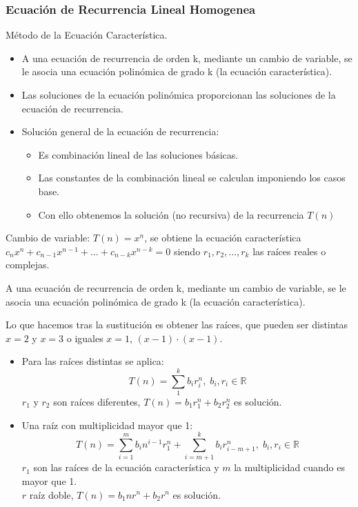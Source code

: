 \subsubsection{Ecuación de Recurrencia Lineal Homogenea}
Método de la Ecuación Característica.
\begin{itemize}
	\item A una ecuación de recurrencia de orden k, mediante un cambio de variable, se le asocia una ecuación polinómica de grado k (la ecuación característica).
	\item Las soluciones de la ecuación polinómica proporcionan las soluciones de la ecuación de recurrencia.
	\item Solución general de la ecuación de recurrencia:
	      \begin{itemize}
		      \item Es combinación lineal de las soluciones básicas.
		      \item Las constantes de la combinación lineal se calculan imponiendo los casos base.
		      \item Con ello obtenemos la solución (no recursiva) de la recurrencia $T(n)$
	      \end{itemize}

\end{itemize}

Cambio de variable: $T(n)= x^n$, se obtiene la ecuación característica $c_n x^n+ c_{n-1}x^{n-1}+ ... + c_{n-k}x^{n-k} = 0$ siendo $r_1, r_2, ..., r_k$ las raíces reales o complejas.

A una ecuación de recurrencia de orden k, mediante un cambio de variable, se le asocia una ecuación polinómica de grado k (la ecuación característica).

Lo que hacemos tras la sustitución es obtener las raíces, que pueden ser distintas $x=2$ y $x=3$ o iguales $x=1$, $(x-1) \cdot (x-1)$.
\begin{itemize}
	\item Para las raíces distintas se aplica:
	      $$T(n) = \sum _1 ^k b_i r_i^n, \; b_i, r_i \in \mathbb{R}$$
	      $r_1$ y $r_2$ son raíces diferentes, $T(n)=b_1r_1^n+b_2r_2^n$ es solución.
	\item Una raíz con multiplicidad mayor que 1:
	      $$T(n) = \sum _{i=1} ^m b_i n^{i-1}r_1^n+\sum _{i=m+1} ^k b_i r_{i-m+1}^n, \; b_i, r_i \in \mathbb{R}$$
	      $r_1$ son las raíces de la ecuación característica y $m$ la multiplicidad cuando es mayor que 1.\\
	      $r$  raíz doble, $T(n)=b_1nr^n+b_2r^n$ es solución.
\end{itemize}

